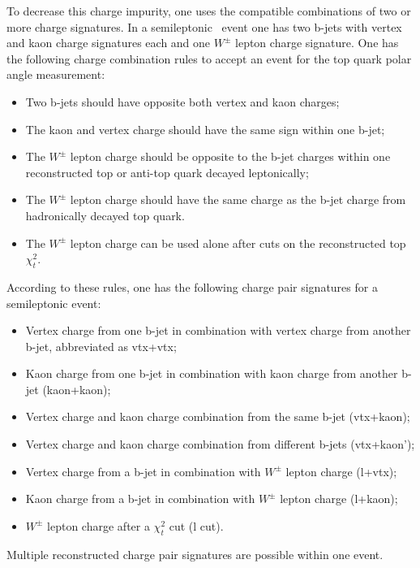 To decrease this charge impurity, one uses the compatible combinations of two or more charge signatures.
In a semileptonic \ttbar\ event one has two b-jets with vertex and kaon charge signatures each and one $W^\pm$ lepton charge signature. 
One has the following charge combination rules to accept an event for the top quark polar angle measurement:
\begin{itemize}
	\item Two b-jets should have opposite both vertex and kaon charges;
	\item The kaon and vertex charge should have the same sign within one b-jet;
	\item The $W^\pm$ lepton charge should be opposite to the b-jet charges within one reconstructed top or anti-top quark decayed leptonically; 
	\item The  $W^\pm$ lepton charge should have the same charge as the b-jet charge from hadronically decayed top quark.
	\item The $W^\pm$ lepton charge can be used alone after cuts on the reconstructed top $\chi^2_{t}$.
\end{itemize}

According to these rules, one has the following charge pair signatures for a semileptonic \ttbar event:
\begin{itemize}
	\item Vertex charge from one b-jet in combination with vertex charge from another b-jet, abbreviated as {\sc vtx+vtx};
	\item Kaon charge from one b-jet in combination with kaon charge from another b-jet ({\sc kaon+kaon});
	\item Vertex charge and kaon charge combination from the same b-jet ({\sc vtx+kaon});
	\item Vertex charge and kaon charge combination from different b-jets ({\sc vtx+kaon'});
	\item  Vertex charge from a b-jet  in combination with $W^\pm$ lepton charge ({\sc l+vtx});
	\item  Kaon charge from a b-jet in combination with $W^\pm$ lepton charge ({\sc l+kaon});
	\item $W^\pm$ lepton charge after a $\chi^2_{t}$ cut  ({\sc l }cut).
\end{itemize}
Multiple reconstructed charge pair signatures are possible within one event.

